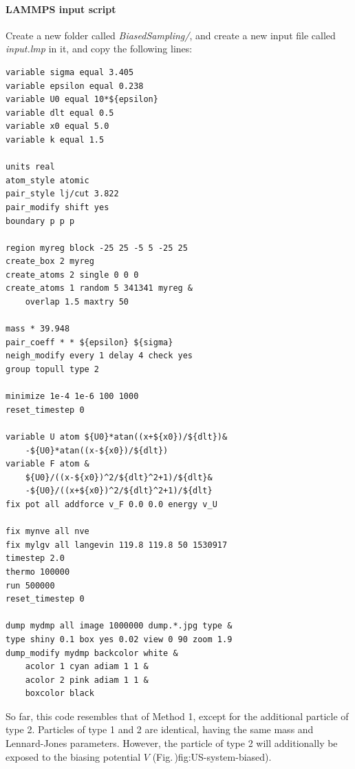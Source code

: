 \documentclass[9pt,tutorial]{livecoms}
\begin{document}
\paragraph{LAMMPS input script}
Create a new folder called \textit{BiasedSampling/}, and create a new input file
called \textit{input.lmp} in it, and copy the following lines:
{\normalsize \begin{verbatim}
variable sigma equal 3.405
variable epsilon equal 0.238
variable U0 equal 10*${epsilon}
variable dlt equal 0.5
variable x0 equal 5.0
variable k equal 1.5

units real
atom_style atomic
pair_style lj/cut 3.822
pair_modify shift yes
boundary p p p

region myreg block -25 25 -5 5 -25 25
create_box 2 myreg
create_atoms 2 single 0 0 0
create_atoms 1 random 5 341341 myreg &
    overlap 1.5 maxtry 50

mass * 39.948
pair_coeff * * ${epsilon} ${sigma}
neigh_modify every 1 delay 4 check yes
group topull type 2

minimize 1e-4 1e-6 100 1000
reset_timestep 0

variable U atom ${U0}*atan((x+${x0})/${dlt})&
    -${U0}*atan((x-${x0})/${dlt})
variable F atom &
    ${U0}/((x-${x0})^2/${dlt}^2+1)/${dlt}&
    -${U0}/((x+${x0})^2/${dlt}^2+1)/${dlt}
fix pot all addforce v_F 0.0 0.0 energy v_U

fix mynve all nve
fix mylgv all langevin 119.8 119.8 50 1530917
timestep 2.0
thermo 100000
run 500000
reset_timestep 0

dump mydmp all image 1000000 dump.*.jpg type &
type shiny 0.1 box yes 0.02 view 0 90 zoom 1.9
dump_modify mydmp backcolor white &
    acolor 1 cyan adiam 1 1 &
    acolor 2 pink adiam 1 1 &
    boxcolor black
\end{verbatim}}
So far, this code resembles that of Method 1, except for the additional particle
of type 2. Particles of type 1 and 2
are identical, having the same mass and Lennard-Jones parameters. However, the
particle of type 2 will additionally be exposed to the biasing potential
$V$ (Fig.\,){fig:US-system-biased}).
\end{document}
